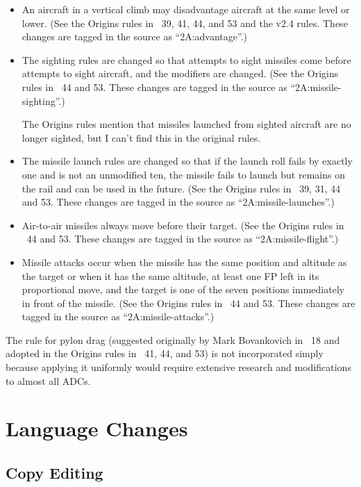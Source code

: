 \documentclass[10pt]{article}
\begin{document}
\begin{itemize}
    \item An aircraft in a vertical climb may disadvantage aircraft at the same level or lower. (See the Origins rules in {\APJ}~39, 41, 44, and 53 and the v2.4 rules. These changes are tagged in the source as “2A:advantage”.)

    \item The sighting rules are changed so that attempts to sight missiles come before attempts to sight aircraft, and the modifiers are changed. (See the Origins rules in {\APJ}~44 and 53. These changes are tagged in the source as “2A:missile-sighting”.) 
    
    The Origins rules mention that missiles launched from sighted aircraft are no longer sighted, but I can’t find this in the original rules.

    \item The missile launch rules are changed so that if the launch roll fails by exactly one and is not an unmodified ten, the missile fails to launch but remains on the rail and can be used in the future. (See the Origins rules in \APJ~39, 31, 44 and 53. These changes are tagged in the source as “2A:missile-launches”.) 

    \item Air-to-air missiles always move before their target. (See the Origins rules in \APJ~44 and 53. These changes are tagged in the source as “2A:missile-flight”.) 

    \item Missile attacks occur when the missile has the same position and altitude as the target or when it has the same altitude, at least one FP left in its proportional move, and the target is one of the seven positions immediately in front of the missile. (See the Origins rules in \APJ~44 and 53. These changes are tagged in the source as “2A:missile-attacks”.) 

\end{itemize}

The rule for pylon drag (suggested originally by Mark Bovankovich in {\APJ}~18 and adopted in the Origins rules in {\APJ}~41, 44, and 53) is not incorporated simply because applying it uniformly would require extensive research and modifications to almost all ADCs.

\section{Language Changes}

\subsection{Copy Editing}
\end{document}
